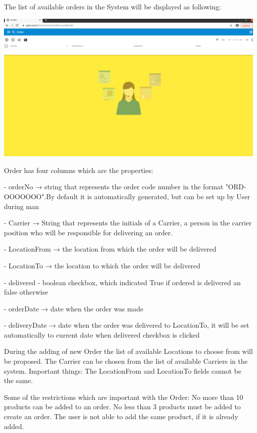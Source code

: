 The list of available orders in the System will be displayed as following:

\includegraphics[width=\textwidth]{sections/01-chapter/images/order3.png}

Order has four columns which are the properties:

- orderNo → string that represents the order code number in the format "ORD-OOOOOOO".By default it is automatically generated, but can be set up by User during man

- Carrier → String that represents the initials of a  Carrier, a person in the carrier position who will be responsible for delivering an order.

- LocationFrom → the location from which the order will be delivered

- LocationTo → the location to which the order will be delivered

- delivered - boolean checkbox, which indicated True if ordered is delivered an false otherwise

- orderDate  →  date when the order was made

- deliveryDate  → date when the order was delivered to LocationTo, it will be set automatically to current date when delivered checkbox is clicked


During the adding of new Order the list of available Locations to choose from will be proposed. The Carrier can be chosen from the list of available Carriers in the system.
Important things: The LocationFrom and LocationTo fields cannot be the same.

Some of the restrictions which are important with the Order:
No more than 10 products can be added to an order.
No less than 3 products must be added to create an order.
The user is not able to add the same product, if it is already added.

